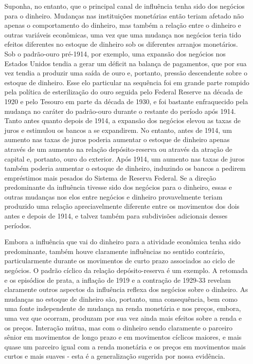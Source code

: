 \documentclass[12pt]{article}
\begin{document}
Suponha, no entanto, que o principal canal de influência tenha sido dos negócios para o dinheiro. Mudanças nas instituições monetárias então teriam afetado não apenas o comportamento do dinheiro, mas também a relação entre o dinheiro e outras variáveis econômicas, uma vez que uma mudança nos negócios teria tido efeitos diferentes no estoque de dinheiro sob os diferentes arranjos monetários. Sob o padrão-ouro pré-1914, por exemplo, uma expansão dos negócios nos Estados Unidos tendia a gerar um déficit na balança de pagamentos, que por sua vez tendia a produzir uma saída de ouro e, portanto, pressão descendente sobre o estoque de dinheiro. Esse elo particular na sequência foi em grande parte rompido pela política de esterilização do ouro seguida pelo Federal Reserve na década de 1920 e pelo Tesouro em parte da década de 1930, e foi bastante enfraquecido pela mudança no caráter do padrão-ouro durante o restante do período após 1914. Tanto antes quanto depois de 1914, a expansão dos negócios elevou as taxas de juros e estimulou os bancos a se expandirem. No entanto, antes de 1914, um aumento nas taxas de juros poderia aumentar o estoque de dinheiro apenas através de um aumento na relação depósito-reserva ou através da atração de capital e, portanto, ouro do exterior. Após 1914, um aumento nas taxas de juros também poderia aumentar o estoque de dinheiro, induzindo os bancos a pedirem empréstimos mais pesados do Sistema de Reserva Federal. Se a direção predominante da influência tivesse sido dos negócios para o dinheiro, essas e outras mudanças nos elos entre negócios e dinheiro provavelmente teriam produzido uma relação apreciavelmente diferente entre os movimentos dos dois antes e depois de 1914, e talvez também para subdivisões adicionais desses períodos.

Embora a influência que vai do dinheiro para a atividade econômica tenha sido predominante, também houve claramente influências no sentido contrário, particularmente durante os movimentos de curto prazo associados ao ciclo de negócios. O padrão cíclico da relação depósito-reserva é um exemplo. A retomada e os episódios de prata, a inflação de 1919 e a contração de 1929-33 revelam claramente outros aspectos da influência reflexa dos negócios sobre o dinheiro. As mudanças no estoque de dinheiro são, portanto, uma consequência, bem como uma fonte independente de mudança na renda monetária e nos preços, embora, uma vez que ocorram, produzam por sua vez ainda mais efeitos sobre a renda e os preços. Interação mútua, mas com o dinheiro sendo claramente o parceiro sênior em movimentos de longo prazo e em movimentos cíclicos maiores, e mais quase um parceiro igual com a renda monetária e os preços em movimentos mais curtos e mais suaves - esta é a generalização sugerida por nossa evidência.
\end{document}

